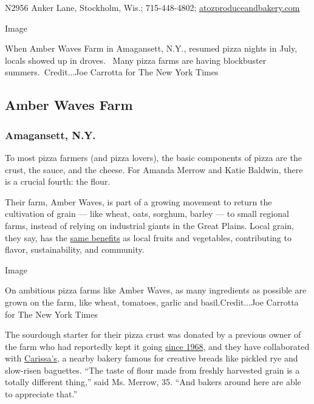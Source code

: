 N2956 Anker Lane, Stockholm, Wis.; 715-448-4802;
\href{https://atozproduceandbakery.com/}{atozproduceandbakery.com}

Image

When Amber Waves Farm in Amagansett, N.Y., resumed pizza nights in July,
locals showed up in droves.~ Many pizza farms are having blockbuster
summers.~Credit...Joe Carrotta for The New York Times

\hypertarget{amber-waves-farm}{%
\subsection{Amber Waves Farm}\label{amber-waves-farm}}

\hypertarget{amagansett-ny}{%
\subsubsection{Amagansett, N.Y.}\label{amagansett-ny}}

To most pizza farmers (and pizza lovers), the basic components of pizza
are the crust, the sauce, and the cheese. For Amanda Merrow and Katie
Baldwin, there is a crucial fourth: the flour.

Their farm, Amber Waves, is part of a growing movement to return the
cultivation of grain --- like wheat, oats, sorghum, barley --- to small
regional farms, instead of relying on industrial giants in the Great
Plains. Local grain, they say, has the
\href{https://www.nytimes3xbfgragh.onion/2018/02/27/dining/row-7-seed-company-dan-barber.html}{same
benefits} as local fruits and vegetables, contributing to flavor,
sustainability, and community.

Image

On ambitious pizza farms like Amber Waves, as many ingredients as
possible are grown on the farm, like wheat, tomatoes, garlic and
basil.Credit...Joe Carrotta for The New York Times

The sourdough starter for their pizza crust was donated by a previous
owner of the farm who had reportedly kept it going
\href{https://www.nytimes3xbfgragh.onion/2015/02/01/nyregion/on-the-east-end-of-long-island-embracing-local-wheat.html}{since
1968}, and they have collaborated with
\href{https://www.carissasthebakery.com/}{Carissa's}, a nearby bakery
famous for creative breads like pickled rye and slow-risen baguettes.
``The taste of flour made from freshly harvested grain is a totally
different thing,'' said Ms. Merrow, 35. ``And bakers around here are
able to appreciate that.''


